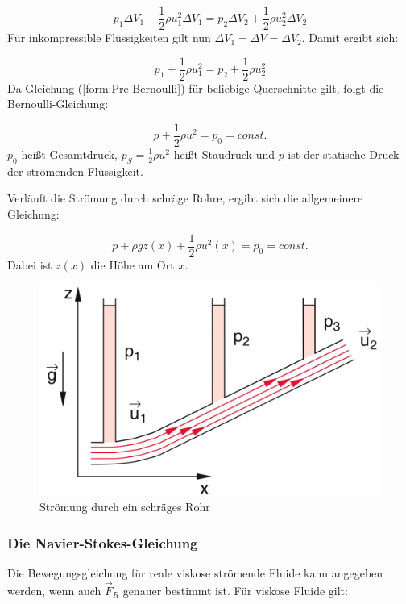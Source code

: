 \begin{equation}
p_1 \Delta V_1 + \frac{1}{2} \rho u_1^2 \Delta V_1 = p_2 \Delta V_2 + \frac{1}{2} \rho u_2^2 \Delta V_2
\end{equation}
Für inkompressible Flüssigkeiten gilt nun $ \Delta V_1 = \Delta V = \Delta V_2 $. Damit ergibt sich:

\begin{equation}
p_1 + \frac{1}{2} \rho u_1^2 = p_2 + \frac{1}{2} \rho u_2^2
\label{form:Pre-Bernoulli}
\end{equation}
Da Gleichung (\ref{form:Pre-Bernoulli}) für beliebige Querschnitte gilt, folgt die Bernoulli-Gleichung:

\begin{equation}
\boxed{p + \frac{1}{2} \rho u^2 = p_0 = const.}
\label{form:Bernoulli-Gleichung}
\end{equation}
$ p_0 $ heißt Gesamtdruck, $ p_S = \frac{1}{2} \rho u^2 $ heißt Staudruck und $p$ ist der statische Druck der strömenden Flüssigkeit.

Verläuft die Strömung durch schräge Rohre, ergibt sich die allgemeinere Gleichung:

\begin{equation}
p + \rho g z(x) + \frac{1}{2} \rho u^2(x) = p_0 = const.
\end{equation}
Dabei ist $z(x)$ die Höhe am Ort $x$.

\begin{figure}
	\centering
        \includegraphics[width=.9\textwidth]{images/8-11}
\caption{ Strömung durch ein schräges Rohr }
\label{fig:8-11}
\end{figure}

\subsubsection{Die Navier-Stokes-Gleichung}
Die Bewegungsgleichung für reale viskose strömende Fluide kann angegeben werden, wenn auch $ \vec{F}_R $ genauer bestimmt ist. Für viskose Fluide gilt:

